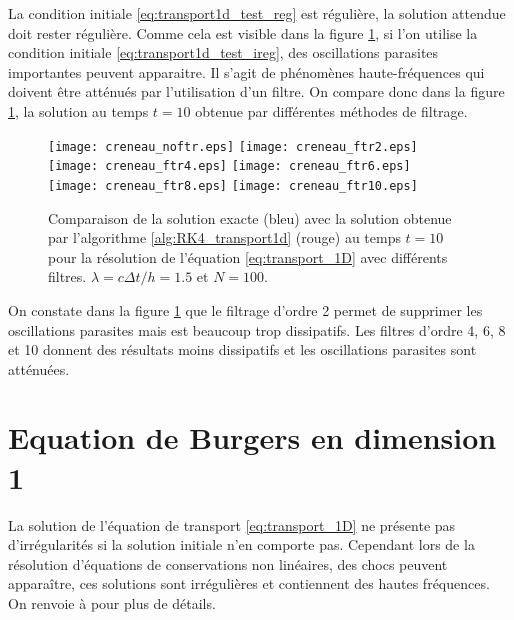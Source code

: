 La condition initiale \eqref{eq:transport1d_test_reg} est régulière, la solution attendue doit rester régulière. Comme cela est visible dans la figure \ref{fig:comp_ireg}, si l'on utilise la condition initiale \eqref{eq:transport1d_test_ireg}, des oscillations parasites importantes peuvent apparaitre. Il s'agit de phénomènes haute-fréquences qui doivent être atténués par l'utilisation d'un filtre. On compare donc dans la figure \ref{fig:comp_ireg}, la solution au temps $t=10$ obtenue par différentes méthodes de filtrage.
\begin{figure}[htbp]
\begin{center}
\texttt{[image: creneau\_noftr.eps]}
\texttt{[image: creneau\_ftr2.eps]}\\
\texttt{[image: creneau\_ftr4.eps]}
\texttt{[image: creneau\_ftr6.eps]}\\
\texttt{[image: creneau\_ftr8.eps]}
\texttt{[image: creneau\_ftr10.eps]}\\
\end{center}
\caption{Comparaison de la solution exacte (bleu) avec la solution obtenue par l'algorithme \ref{alg:RK4_transport1d} (rouge) au temps $t=10$ pour la résolution de l'équation \eqref{eq:transport_1D} avec différents filtres. $\lambda = c \Delta t / h = 1.5$ et $N=100$.}
\label{fig:comp_ireg}
\end{figure}
On constate dans la figure \ref{fig:comp_ireg} que le filtrage d'ordre 2 permet de supprimer les oscillations parasites mais est beaucoup trop dissipatifs. Les filtres d'ordre 4, 6, 8 et 10 donnent des résultats moins dissipatifs et les oscillations parasites sont atténuées.

















\section{Equation de Burgers en dimension 1}

La solution de l'équation de transport \eqref{eq:transport_1D} ne présente pas d'irrégularités si la solution initiale n'en comporte pas. Cependant lors de la résolution d'équations de conservations non linéaires, des chocs peuvent apparaître, ces solutions sont irrégulières et contiennent des hautes fréquences. On renvoie à \cite{Witham1974} pour plus de détails.

